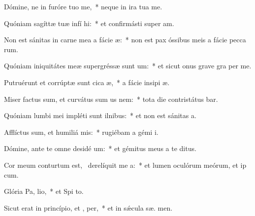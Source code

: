 \item Dómine, ne in furóre tuo  me,~* neque in ira tua  me.
\item Quóniam sagíttæ tuæ infí  hi:~* et confirmásti super   am.
\item Non est sánitas in carne mea a fácie  æ:~* non est pax óssibus meis a fácie pecca rum.
\item Quóniam iniquitátes meæ supergréssæ sunt  um:~* et sicut onus grave gra  per me.
\item Putruérunt et corrúptæ sunt cica æ,~* a fácie insipi æ.
\item Miser factus sum, et curvátus sum us  nem:~* tota die contristátus bar.
\item Quóniam lumbi mei impléti sunt ilnibus:~* et non est sánitas   a.
\item Afflíctus sum, et humiliá  mis:~* rugiébam a gémi  i.
\item Dómine, ante te omne desidé um:~* et gémitus meus a te   ditus.
\item Cor meum conturtum est,~\pscross{} derelíquit me  a:~* et lumen oculórum meórum, et ip   cum.
\item Glória Pa,  lio,~* et Spi to.
\item Sicut erat in princípio, et ,  per,~* et in sǽcula sæ. men.

